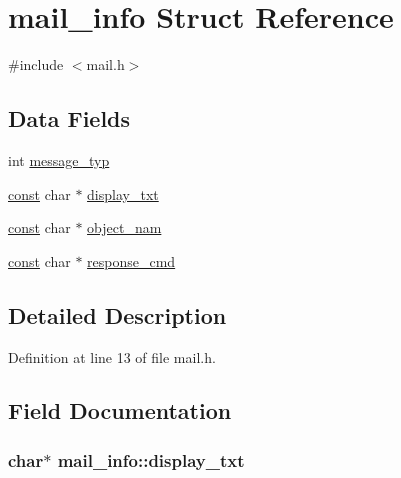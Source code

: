 \hypertarget{structmail__info}{\section{mail\+\_\+info Struct Reference}
\label{structmail__info}
}


{\ttfamily \#include $<$mail.\+h$>$}

\subsection*{Data Fields}
\begin{DoxyCompactItemize}
\item 
int \hyperlink{structmail__info_a05e8b112dfdcc92e6d78cd95acce6e33}{message\+\_\+typ}
\item 
\hyperlink{tradstdc_8h_a2c212835823e3c54a8ab6d95c652660e}{const} char $\ast$ \hyperlink{structmail__info_a9ffa432e96a05d1272ab002df6dc2966}{display\+\_\+txt}
\item 
\hyperlink{tradstdc_8h_a2c212835823e3c54a8ab6d95c652660e}{const} char $\ast$ \hyperlink{structmail__info_a453d58876054570560ffbcb93668f3bf}{object\+\_\+nam}
\item 
\hyperlink{tradstdc_8h_a2c212835823e3c54a8ab6d95c652660e}{const} char $\ast$ \hyperlink{structmail__info_ac0ac765f48a9c2ea635f3de3ac53fde0}{response\+\_\+cmd}
\end{DoxyCompactItemize}


\subsection{Detailed Description}


Definition at line 13 of file mail.\+h.



\subsection{Field Documentation}
\hypertarget{structmail__info_a9ffa432e96a05d1272ab002df6dc2966}{
\subsubsection[{display\+\_\+txt}]{ char$\ast$ mail\+\_\+info\+::display\+\_\+txt}}\label{structmail__info_a9ffa432e96a05d1272ab002df6dc2966}


